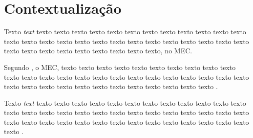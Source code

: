 \chapter{Contextualização}
\label{chap:intro}


 Texto \textit{text} texto texto texto texto texto texto texto texto texto texto texto texto texto texto texto texto texto texto texto texto texto texto texto texto texto texto texto texto texto texto texto texto texto texto texto, no \gls{MEC}.

 Segundo , o \gls{MEC}, texto texto texto texto texto texto texto texto texto texto texto texto texto texto texto texto texto texto texto texto texto texto texto texto texto texto texto texto texto texto texto texto texto texto texto texto .
 
 \begin{citacao}
 Texto \textit{text} texto texto texto texto texto texto texto texto texto texto texto texto texto texto texto texto texto texto texto texto texto texto texto texto texto texto texto texto texto texto texto texto texto texto texto texto texto texto texto texto texto \cite{manualufpe2020}.  
 \end{citacao}


 
 